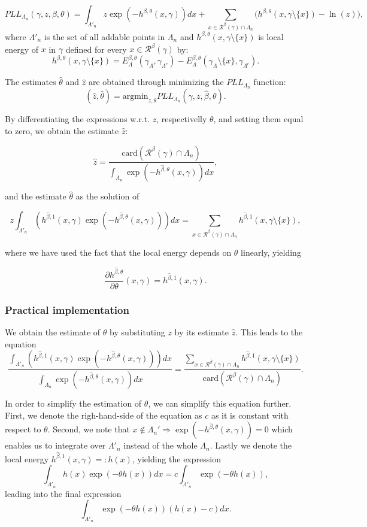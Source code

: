 \documentclass[12pt,a4paper]{report}
\begin{document}
$$PLL_{\Lambda_n}(\gamma,z,\beta, \theta) = \int_{\Lambda'_n} z \exp (-h^{\beta,\theta}(x,\gamma)) dx + \sum_{x\in\mathcal R^\beta(\gamma)\cap \Lambda_n} \big(h^{\beta,\theta}(x,\gamma\setminus\{x\}) - \ln(z)\big),$$
where $\Lambda'_n$ is the set of all addable points in $\Lambda_n$ and $h^{\beta,\theta}(x, \gamma \setminus \{x\})$ is local energy of $x$ in $\gamma$ defined for every $x\in\mathcal R^\beta(\gamma)$ by:
$$h^{\beta,\theta}(x, \gamma \setminus \{x\}) = E^{\beta,\theta}_\Lambda(\gamma_\Lambda, \gamma_{\Lambda^c}) - E^{\beta,\theta}_\Lambda(\gamma_\Lambda\setminus\{x\}, \gamma_{\Lambda^c}).$$

The estimates $\hat\theta$ and $\hat z$ are obtained through minimizing the $PLL_{\Lambda_n}$ function:
$$(\hat z, \hat\theta) = \text{argmin}_{z,\theta} PLL_{\Lambda_n} (\gamma, z, \hat\beta,\theta).$$

By differentiating the expressions w.r.t. $z$, respectivelly $\theta$, and setting them equal to zero, we obtain the estimate $\hat z$:

$$ \hat z = \frac{\mbox{card}(\mathcal R^\beta(\gamma)\cap \Lambda_n)}{\int_{\Lambda_n} \exp{\left( -h^{\hat\beta,\theta}(x,\gamma)\right)} dx},$$

and the estimate $\hat\theta$ as the solution of

$$ z \int_{\Lambda'_n} (h^{\hat\beta,1}(x,\gamma)\exp{\left(-h^{\hat\beta,\theta}(x,\gamma)\right)}) dx = \sum_{x \in \mathcal R^{\hat\beta}(\gamma)\cap \Lambda_n} h^{\hat\beta,1}(x,\gamma\setminus\{x\}),$$

where we have used the fact that the local energy depends on $\theta$ linearly, yielding

$$\frac{\partial h^{\hat\beta,\theta}}{\partial \theta} (x,\gamma) = h^{\hat\beta,1}(x,\gamma).$$

\subsubsection{Practical implementation}
We obtain the estimate of $\theta$ by substituting $z$ by its estimate $\hat z$.
This leads to the equation
$$ 
\frac{\int_{\Lambda'_n} (h^{\hat\beta,1}(x,\gamma)\exp{\left(-h^{\hat\beta,\theta}(x,\gamma)\right)}) dx} {  \int_{\Lambda_n} \exp{\left( -h^{\hat\beta,\theta}(x,\gamma)\right)} dx} 
= \frac {\sum_{x \in \mathcal R^{\hat\beta}(\gamma)\cap \Lambda_n} h^{\hat\beta,1}(x,\gamma\setminus\{x\})} { \mbox{card}(\mathcal R^\beta(\gamma)\cap \Lambda_n) }. 
$$

In order to simplify the estimation of $\theta$, we can simplify this equation further. First, we denote the righ-hand-side of the equation as $c$ as it  is constant with respect to $\theta$. Second, we note that $x \notin \Lambda_n'  \Rightarrow \exp{\left(-h^{\hat\beta,\theta}(x,\gamma)\right)}= 0$ which enables us to integrate over $\Lambda'_n$ instead of the whole $\Lambda_n$. Lastly we denote the local energy $h^{\hat\beta,1}(x,\gamma) =: h(x)$, yielding the expression
$$ \int_{\Lambda'_n} h(x) \exp{\left(-\theta h(x)\right)} dx = c \int_{\Lambda'_n} \exp{\left(-\theta h(x)\right)}, $$
leading into the final expression
$$ \int_{\Lambda'_n} \exp{\left(-\theta h(x)\right)} (h(x) - c) dx .$$ 
\end{document}
